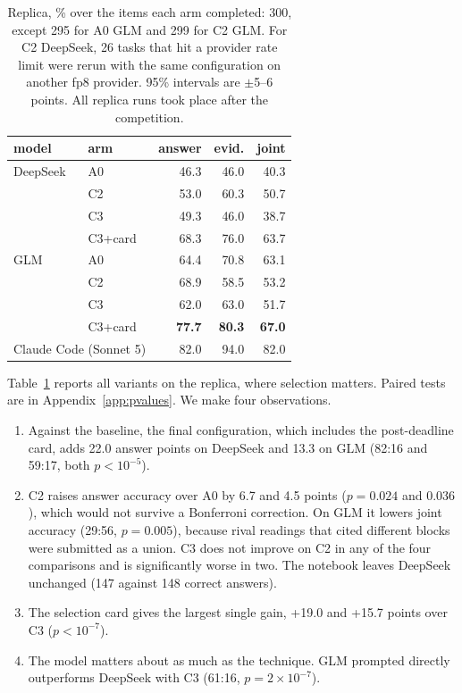 \documentclass[11pt]{article}%
\begin{document}
\begin{table}[t]
\centering
\small
\setlength{\tabcolsep}{4pt}
\begin{tabular}{llrrr}
\toprule
model & arm & answer & evid. & joint \\
\midrule
DeepSeek & \textsc{A0}      & 46.3 & 46.0 & 40.3 \\
         & \textsc{C2}      & 53.0 & 60.3 & 50.7 \\
         & \textsc{C3}      & 49.3 & 46.0 & 38.7 \\
         & \textsc{C3}+card & 68.3 & 76.0 & 63.7 \\
\midrule
GLM      & \textsc{A0}      & 64.4 & 70.8 & 63.1 \\
         & \textsc{C2}      & 68.9 & 58.5 & 53.2 \\
         & \textsc{C3}      & 62.0 & 63.0 & 51.7 \\
         & \textsc{C3}+card & \textbf{77.7} & \textbf{80.3} & \textbf{67.0} \\
\midrule
\multicolumn{2}{l}{Claude Code (Sonnet 5)} & 82.0 & 94.0 & 82.0 \\
\bottomrule
\end{tabular}
\caption{Replica, \% over the items each arm completed: 300, except 295 for
\textsc{A0} GLM and 299 for \textsc{C2} GLM. For \textsc{C2} DeepSeek, 26 tasks that hit a provider rate
limit were rerun with the same configuration on another fp8 provider.
95\% intervals are $\pm$5--6 points. All replica runs took place after the
competition.}
\label{tab:replica}
\end{table}

Table~\ref{tab:replica} reports all variants on the replica, where selection matters.
Paired tests are in Appendix~\ref{app:pvalues}. We make four observations.
\begin{enumerate}
\item Against the baseline, the final configuration, which includes the
      post-deadline card, adds 22.0 answer points on DeepSeek and 13.3 on GLM
      (82:16 and 59:17, both $p<10^{-5}$).
\item \textsc{C2} raises answer accuracy over \textsc{A0} by 6.7 and 4.5
      points ($p=0.024$ and $0.036$), which would not survive a Bonferroni
      correction. On GLM it lowers joint accuracy (29:56, $p=0.005$), because
      rival readings that cited different blocks were submitted as a union.
      \textsc{C3} does not improve on \textsc{C2} in any of the four
      comparisons and is significantly worse in two. The notebook leaves
      DeepSeek unchanged (147 against 148 correct answers).
\item The selection card gives the largest single gain, +19.0 and +15.7
      points over \textsc{C3} ($p<10^{-7}$).
\item The model matters about as much as the technique. GLM prompted directly
      outperforms DeepSeek with \textsc{C3} (61:16, $p=2{\times}10^{-7}$).
\end{enumerate}
\end{document}
